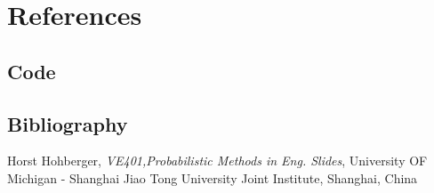 \documentclass[conf]{new-aiaa}
\begin{document}
\section{References}

\subsection{Code}

\subsection{Bibliography}

\begin{thebibliography}{9}
Horst Hohberger, \emph{VE401,Probabilistic Methods in Eng. Slides}, University OF Michigan - Shanghai Jiao Tong University Joint Institute, Shanghai, China

\end{thebibliography}
\end{document}
